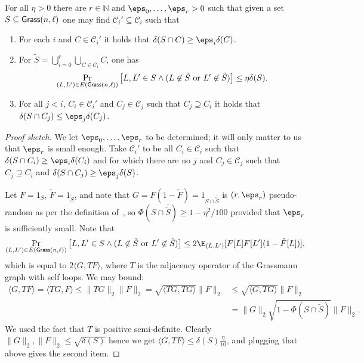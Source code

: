 \begin{theorem}
For all $\eta>0$ there 
are $r\in\mathbb{N}$ and
$\eps_0,\ldots,\eps_r>0$ such that 
given a set 
$S\subseteq {\sf Grass}(n,\ell)$ 
one may find $\mathcal{C}_i'\subseteq \mathcal{C}_i$ 
such that 
\begin{enumerate}
    \item For each $i$ and $C\in\mathcal{C}_i'$ it holds 
    that $\delta(S\cap C)\geq \eps_i\delta(C)$.
    \item For $\tilde{S} = \bigcup_{i=0}^{r} \bigcup_{C\in \mathcal{C}_i} C$, one has 
    \[
    \Pr_{(L,L')\in E({\sf Grass}(n,\ell))}\left[L,L'\in S\land 
    (L\not\in\tilde{S}\text{ or }L'\not\in\tilde{S})\right]\leq \eta\delta(S).
    \]
    \item For all $j<i$, $C_i\in\mathcal{C}_i'$ and 
    $C_j\in \mathcal{C}_j$ such that $C_j\supseteq C_i$ 
    it holds that $\delta(S\cap C_j)\leq \eps_j \delta(C_j)$.
\end{enumerate}
\end{theorem}
\begin{proof}[Proof sketch]
We let $\eps_0,\ldots,\eps_r$ to be determined; it will only
matter to us that $\eps_r$ is small enough. 
Take $\mathcal{C}_i'$ to be all $C_i\in \mathcal{C}_i$ 
such that $\delta(S\cap C_i)\geq \eps_i \delta(C_i)$ and 
for which there are no $j$ and $C_j\in\mathcal{C}_j$ 
such that $C_j\supseteq C_i$ and $\delta(S\cap C_j)\geq \eps_j \delta(S)$.

Let $F = 1_S$, $\tilde{F} = 1_{\tilde{S}}$, 
and note that $G = F(1-\tilde{F}) = 1_{S\cap \overline{\tilde{S}}}$ 
is $(r,\eps_r)$ pseudo-random as per the definition of~\cite{KhotMS18}, so $\Phi(S\cap \overline{\tilde{S}})\geq 1-\eta^2/100$ provided that $\eps_r$ is sufficiently small. Note that
\[
\Pr_{(L,L')\in E({\sf Grass}(n,\ell))}\left[L,L'\in S\land 
    (L\not\in\tilde{S}\text{ or }L'\not\in\tilde{S})\right]
    \leq 2\E_{(L,L')}[F[L]F[L'](1-\tilde{F}[L])],
\]
which is equal to $2\langle G, T F\rangle$, where 
$T$ is the adjacency operator of the Grassmann graph with 
self loops. 
We may bound:
\begin{align*}
\langle G, T F\rangle
=
\langle T G, F\rangle
\leq \|T G\|_2\|F\|_2
= \sqrt{\langle T G, TG\rangle} \|F\|_2
&\leq \sqrt{\langle G, TG\rangle} \|F\|_2\\
&=\|G\|_2\sqrt{1-\Phi(S\cap\overline{\tilde{S}})} \|F\|_2.
\end{align*}
We used the fact that $T$ is positive semi-definite. 
Clearly $\|G\|_2,\|F\|_2\leq \sqrt{\delta(S)}$ hence we get
$\langle G, T F\rangle\leq \delta(S)\frac{\eta}{10}$, 
and plugging that above gives the second item.
\end{proof}
